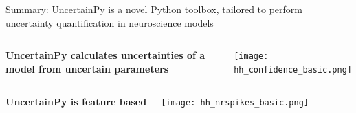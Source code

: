 \documentclass[presentation]{beamer}
\begin{document}
  \begin{frame}{Summary: UncertainPy is a novel Python toolbox, tailored to perform uncertainty quantification in neuroscience models}
\vspace{-10mm}
\begin{columns}

     \begin{center}
        \raggedright
      \bf{UncertainPy calculates uncertainties of a model from uncertain parameters}
     \end{center}
     \begin{center}
            \texttt{[image: hh\_confidence\_basic.png]}
     \end{center}

 \end{columns}


\begin{columns}
  \begin{center}
      \raggedright
   \bf{UncertainPy is feature based}
  \end{center}
     \begin{center}
            \texttt{[image: hh\_nrspikes\_basic.png]}
     \end{center}

 \end{columns}




\pause
{}



\end{frame}
\end{document}
